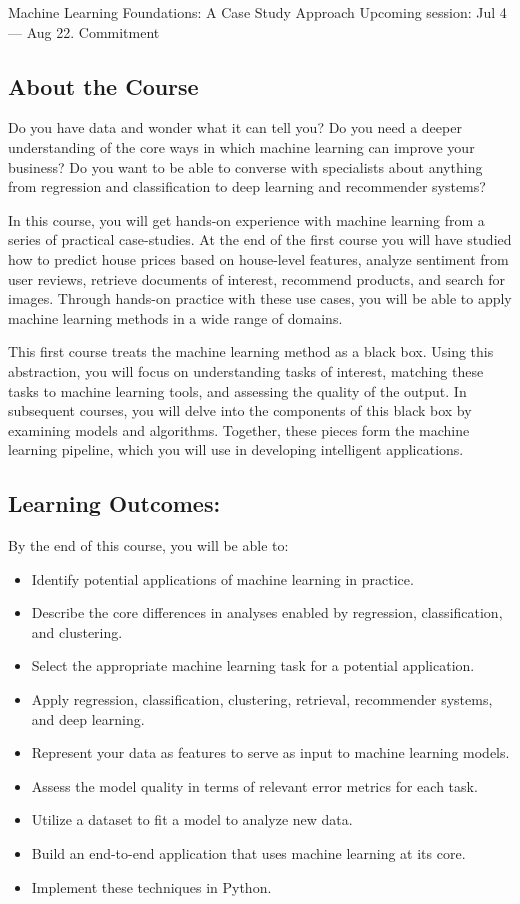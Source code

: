 Machine Learning Foundations: A Case Study Approach
Upcoming session: Jul 4 — Aug 22.
Commitment
\subsection{About the Course}
Do you have data and wonder what it can tell you?  Do you need a deeper understanding of the core ways in which machine learning can improve your business?  Do you want to be able to converse with specialists about anything from regression and classification to deep learning and recommender systems?

In this course, you will get hands-on experience with machine learning from a series of practical case-studies.  At the end of the first course you will have studied how to predict house prices based on house-level features, analyze sentiment from user reviews, retrieve documents of interest, recommend products, and search for images.  Through hands-on practice with these use cases, you will be able to apply machine learning methods in a wide range of domains.

This first course treats the machine learning method as a black box.  Using this abstraction, you will focus on understanding tasks of interest, matching these tasks to machine learning tools, and assessing the quality of the output. In subsequent courses, you will delve into the components of this black box by examining models and algorithms.  Together, these pieces form the machine learning pipeline, which you will use in developing intelligent applications.

\subsection*{Learning Outcomes:}  By the end of this course, you will be able to:
\begin{itemize}
\item Identify potential applications of machine learning in practice.  
	\item Describe the core differences in analyses enabled by regression, classification, and clustering.
	\item Select the appropriate machine learning task for a potential application.  
	\item Apply regression, classification, clustering, retrieval, recommender systems, and deep learning.
	\item Represent your data as features to serve as input to machine learning models. 
	\item Assess the model quality in terms of relevant error metrics for each task.
	\item Utilize a dataset to fit a model to analyze new data.
	\item Build an end-to-end application that uses machine learning at its core.  
	\item Implement these techniques in Python.
\end{itemize}

